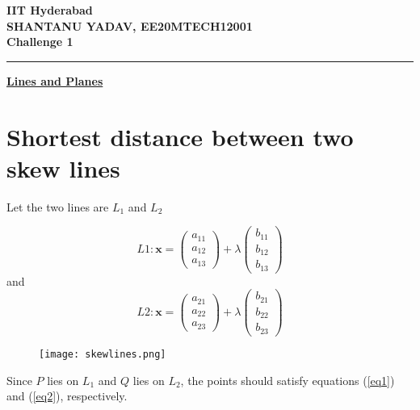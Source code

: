 \documentclass[12pt]{article}
\begin{document}
\begin{center}
	{\Large \bf IIT Hyderabad} \\ \vspace{2ex}
	{\large \bf SHANTANU YADAV, EE20MTECH12001 }\\
	\vspace{2ex}
	{\large \bf Challenge 1} \\
\end{center}
	\hrule

\vspace{2ex}
\begin{center}
{\underline{\Large \bf Lines and Planes}}
\end{center}

\section*{Shortest distance between two skew lines}
	Let the two lines are $L_1$ and $L_2$

\begin{equation}
	L1 : \mathbf{x} = 
\begin{pmatrix}
	a_{11} \\
	a_{12} \\
	a_{13}
\end{pmatrix}
	+ \lambda
\begin{pmatrix}
	b_{11} \\
	b_{12} \\
	b_{13}
\end{pmatrix}
	\label{eq1}
\end{equation}
and
\begin{equation}
	L2 : \mathbf{x} = 
\begin{pmatrix}
	a_{21} \\
	a_{22} \\
	a_{23}
\end{pmatrix}
	+ \lambda
\begin{pmatrix}
	b_{21} \\
	b_{22} \\
	b_{23}
\end{pmatrix}
	\label{eq2}
\end{equation}


\begin{figure}[htbp]
	\centering
\texttt{[image: skewlines.png]}
\end{figure}
\noindent
Since $P$ lies on $L_1$ and $Q$ lies on $L_2$, the points should satisfy 
	equations (\ref{eq1}) and (\ref{eq2}), respectively.
\end{document}
